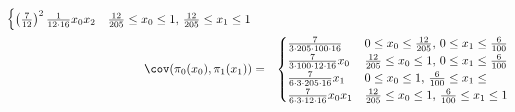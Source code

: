 \begin{description}
\begin{eqnarray*}
\begin{cases}
\left(\frac{7}{12}\right)^2  \frac{1}{12\cdot 16}x_0x_2&\frac{12}{205}\leq x_0 \leq 1,\,\frac{12}{205}\leq x_1\leq 1
\end{cases}\\
\cov(\pi_0(x_0),\pi_1(x_1))&=&\begin{cases}
\frac{7}{3\cdot 205\cdot 100\cdot 16}&0\leq x_0 \leq \frac{12}{205},\,0\leq x_1\leq \frac{6}{100}\\
\frac{7}{3\cdot 100\cdot 12\cdot 16}x_0&\frac{12}{205}\leq x_0 \leq 1 ,\,0\leq x_1\leq \frac{6}{100}\\
\frac{7}{6\cdot 3\cdot 205\cdot 16}x_1&0\leq x_0 \leq 1 ,\,\frac{6}{100}\leq x_1\leq \\
\frac{7}{6\cdot 3\cdot 12\cdot 16}x_0x_1&\frac{12}{205}\leq x_0 \leq 1,\,\frac{6}{100}\leq x_1\leq 1
\end{cases}
\end{eqnarray*}
\end{description}

